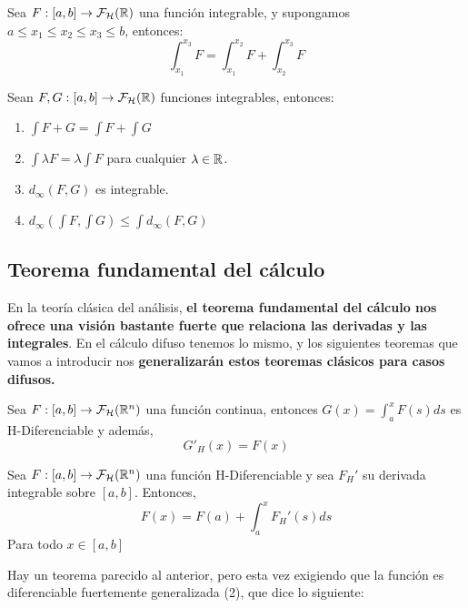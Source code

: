 \begin{teorema}
  Sea $F :  [a, b] \rightarrow \mathcal{F}_\mathcal{H}(\mathbb R)$ una función integrable, y supongamos $a \leq x_1 \leq x_2 \leq x_3 \leq b$, entonces:
  \[
  \int_{x_1}^{x_3} F = \int_{x_1}^{x_2} F + \int_{x_2}^{x_3} F
  \]
\end{teorema}

\begin{teorema}
  Sean $F, G :  [a, b] \rightarrow \mathcal{F}_\mathcal{H}(\mathbb R)$ funciones integrables, entonces:
  
  \begin{enumerate}
  \item $\int F + G = \int F + \int G$
  \item $\int \lambda F = \lambda \int F$ para cualquier $\lambda \in \mathbb R$.
  \item $d_\infty(F, G)$ es integrable.
  \item $d_\infty(\int F, \int G) \leq \int d_\infty(F, G)$
  \end{enumerate}
\end{teorema}

\subsection{Teorema fundamental del cálculo}
En la teoría clásica del análisis, \textbf{el teorema fundamental del cálculo nos ofrece una visión bastante fuerte que relaciona las derivadas y las integrales}. En el cálculo difuso tenemos lo mismo, y los siguientes teoremas que vamos a introducir nos \textbf{generalizarán estos teoremas clásicos para casos difusos.}

\begin{teorema}
  Sea $F : [a, b] \rightarrow \mathcal{F}_\mathcal{H} (\mathbb R^n)$ una función continua, entonces $G(x) = \int_{a}^{x} F(s) ds$ es H-Diferenciable y además,
  \[
  G'_H(x) = F(x)
  \]
\end{teorema}

\begin{teorema}
  Sea $F : [a, b] \rightarrow  \mathcal{F}_\mathcal{H} (\mathbb R^n)$ una función H-Diferenciable y sea $F_H'$ su derivada integrable sobre $[a, b]$. Entonces,
  \[
  F(x) = F(a) + \int_{a}^{x}F_H'(s) ds
  \]
  Para todo $x \in [a, b]$
\end{teorema}

Hay un teorema parecido al anterior, pero esta vez exigiendo que la función es diferenciable fuertemente generalizada (2), que dice lo siguiente:

